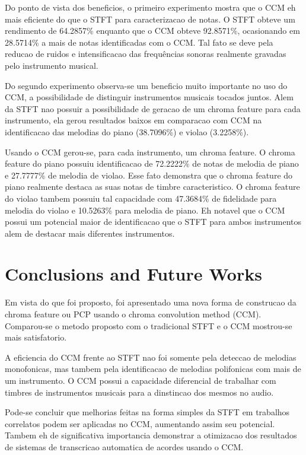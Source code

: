 \documentclass{article}
\begin{document}
	Do ponto de vista dos beneficios, o primeiro experimento mostra que o CCM eh mais eficiente do que o STFT para caracterizacao de notas. O STFT obteve um rendimento de 64.2857\% enquanto que o CCM obteve 92.8571\%, ocasionando em 28.5714\% a mais de notas identificadas com o CCM. Tal fato se deve pela reducao de ruidos e intensificacao das frequências sonoras realmente gravadas pelo instrumento musical. 

	Do segundo experimento observa-se um beneficio muito importante no uso do CCM, a possibilidade de distinguir instrumentos musicais tocados juntos. Alem da STFT nao possuir a possibilidade de geracao de um chroma feature para cada instrumento, ela gerou resultados baixos em comparacao com CCM na identificacao das melodias do piano (38.7096\%) e violao (3.2258\%).

	Usando o CCM gerou-se, para cada instrumento, um chroma feature. O chroma feature do piano possuiu identificacao de 72.2222\% de notas de melodia de piano e 27.7777\% de melodia de violao. Esse fato demonstra que o chroma feature do piano realmente destaca as suas notas de timbre caracteristico. O chroma feature do violao tambem possuiu tal capacidade com 47.3684\% de fidelidade para melodia do violao e 10.5263\% para melodia de piano. Eh notavel que o CCM possui um potencial maior de identificacao que o STFT para ambos instrumentos alem de destacar mais diferentes instrumentos.


	\section{Conclusions and Future Works}\label{sec:conclusions}

	Em vista do que foi proposto, foi apresentado uma nova forma de construcao da chroma feature ou PCP usando o chroma convolution method (CCM). Comparou-se o metodo proposto com o tradicional STFT e o CCM mostrou-se mais satisfatorio. 

	A eficiencia do CCM frente ao STFT nao foi somente pela deteccao de melodias monofonicas, mas tambem pela identificacao de melodias polifonicas com mais de um instrumento. O CCM possui a capacidade diferencial de trabalhar com timbres de instrumentos musicais para a dinstincao dos mesmos no audio.

	 Pode-se concluir que melhorias feitas na forma simples da STFT em trabalhos correlatos podem ser aplicadas no CCM, aumentando assim seu potencial. Tambem eh de significativa importancia demonstrar a otimizacao dos resultados de sistemas de transcricao automatica de acordes usando o CCM.
\end{document}

